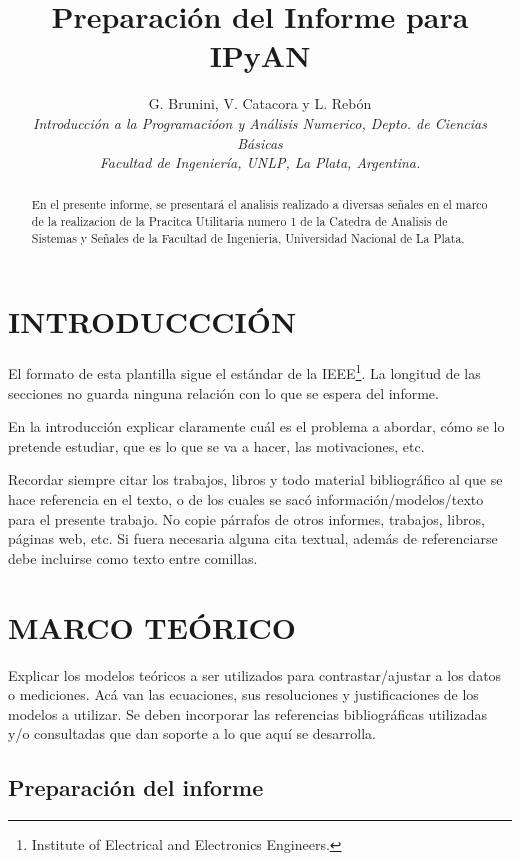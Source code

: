 \documentclass[a4paper, 10pt, conference]{ieeeconf}      %
\title{\LARGE \bf
Preparación del Informe para IPyAN
}
\author{G. Brunini, V. Catacora y L. Reb\'on\\ %
{\it Introducción a la Programacióon y Análisis Numerico, Depto. de Ciencias B\'asicas}\\  {\it Facultad de Ingenier\'ia, UNLP, La Plata, Argentina.}}                                            %
\begin{document}
\maketitle
\thispagestyle{empty}
\pagestyle{empty}


\begin{abstract}

En el presente informe, se presentará el analisis realizado a diversas señales en el marco de la realizacion de la Pracitca Utilitaria numero 1 de la Catedra de Analisis de Sistemas y Señales de la Facultad de Ingenieria, Universidad Nacional de La Plata.

\end{abstract}


\section{INTRODUCCCI\'ON}

El formato de esta plantilla sigue el est\'andar de la IEEE\footnote{Institute of Electrical and Electronics Engineers.}.  La longitud de las secciones no guarda ninguna relaci\'on con lo que se espera del informe.

En la introducci\'on explicar claramente cu\'al es el problema a abordar, c\'omo se lo pretende estudiar, que es lo que se va a hacer, las motivaciones, etc.

Recordar siempre citar los trabajos, libros y todo material bibliogr\'afico al que se hace referencia en el texto, o de los cuales se sac\'o informaci\'on/modelos/texto para el presente trabajo. No copie p\'arrafos de otros informes, trabajos, libros, p\'aginas web, etc. Si fuera necesaria alguna cita textual, adem\'as de referenciarse debe incluirse como texto entre comillas.


\section{MARCO TE\'ORICO}

Explicar los modelos te\'oricos a ser utilizados para contrastar/ajustar a los datos o mediciones. Ac\'a van las ecuaciones, sus resoluciones y justificaciones de los modelos a utilizar. Se deben incorporar las referencias bibliogr\'aficas utilizadas y/o consultadas que dan soporte a lo que aqu\'i se desarrolla.

\subsection{Preparaci\'on del informe}
\end{document}
